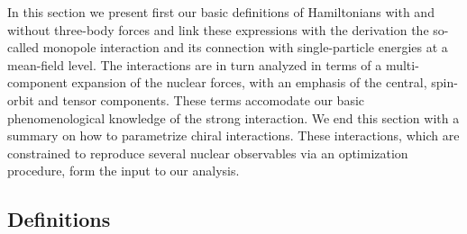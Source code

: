\documentclass[aps,showpacs,floatfix,nofootinbib,preprintnumbers,superscriptaddress,amsmath,amssymb]{revtex4-1}
\begin{document}
In this section we present first our basic definitions of Hamiltonians
with and without three-body forces and link these expressions with the
derivation the so-called monopole interaction and its connection with
single-particle energies at a mean-field level. The interactions are
in turn analyzed in terms of a multi-component expansion of the
nuclear forces, with an emphasis of the central, spin-orbit and tensor
components. These terms accomodate our basic phenomenological
knowledge of the strong interaction. We end this section with a
summary on how to parametrize chiral interactions. These interactions,
which are constrained to reproduce several nuclear observables via an
optimization procedure, form the input to our analysis.
 
\subsection{Definitions}\label{subsec:definitions}
\end{document}
